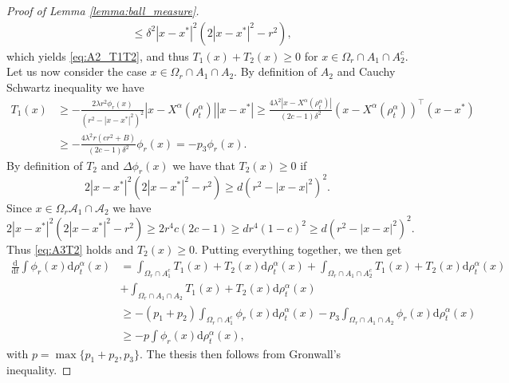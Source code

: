 \documentclass[10pt,a4paper]{amsart}
\newcommand{\Xalpha}{{X^\alpha}}
\newcommand{\diff}{\mathrm{d}}
\begin{document}
\begin{proof}[Proof of Lemma \ref{lemma:ball_measure}]
\begin{equation*}
\begin{aligned}
    &\leq \delta^2 |x-x^*|^2\left(2 |x-x^*|^2-r^2\right),
\end{aligned}\end{equation*}
which yields \eqref{eq:A2_T1T2}, and thus $T_1(x)+T_2(x)\geq 0$ for $x\in \Omega_r\cap A_1\cap A_2^c$.
Let us now consider the case $x\in \Omega_r\cap A_1\cap A_2$. By definition of $A_2$ and Cauchy Schwartz inequality we have 
\begin{equation}\begin{aligned}
    T_1(x)&\geq-\frac{2\lambda r^2\phi_r(x)}{(r^2- |x-x^*|^2)^2}|x-\Xalpha(\rho^\alpha_t)| |x-x^*|\geq \frac{4\lambda^2|x-\Xalpha(\rho^\alpha_t)|}{(2c-1)\delta^2}(x-\Xalpha(\rho^\alpha_t))^\top(x-x^*)\\
    & \geq -\frac{4\lambda^2r(cr^2+B)}{(2c-1)\delta^2}\phi_r(x) = -p_3\phi_r(x).
\end{aligned}\end{equation}
By definition of $T_2$ and $\Delta\phi_r(x)$ we have that $T_2(x)\geq 0 $ if 
\begin{equation}\label{eq:A3T2}
    2 |x-x^*|^2(2 |x-x^*|^2-r^2)\geq d(r^2-|x-x|^2)^2.
\end{equation}
Since $x\in\Omega_r\mathcal{A}_1\cap \mathcal{A}_2$ we have 
\begin{equation*}
  2 |x-x^*|^2(2 |x-x^*|^2-r^2)\geq 2r^4c(2c-1)\geq dr^4(1-c)^2\geq d(r^2-|x-x|^2)^2.
\end{equation*}
Thus \eqref{eq:A3T2} holds and $T_2(x)\geq 0$.
Putting everything together, we then get 
\begin{equation}\begin{aligned}
    \frac{\diff}{\diff t}\int\phi_r(x)\diff\rho^\alpha_t(x) &=
    \int_{\Omega_r\cap A_1^c} T_1(x)+T_2(x)\diff\rho^\alpha_t(x) +
    \int_{\Omega_r\cap A_1\cap A_2^c} T_1(x)+T_2(x)\diff\rho^\alpha_t(x) \\& +
    \int_{\Omega_r\cap A_1\cap A_2} T_1(x)+T_2(x)\diff\rho^\alpha_t(x)\\
    &\geq -(p_1+p_2)\int_{\Omega_r\cap A_1^c} \phi_r(x)\diff\rho^\alpha_t(x) 
    -p_3\int_{\Omega_r\cap A_1\cap A_2} \phi_r(x)\diff\rho^\alpha_t(x)\\
    &\geq -p\int\phi_r(x)\diff\rho^\alpha_t(x),
\end{aligned}\end{equation}
 with $p=\max\{p_1+p_2,p_3\}$. The thesis then follows from Gronwall's inequality.
\end{proof}
\end{document}
